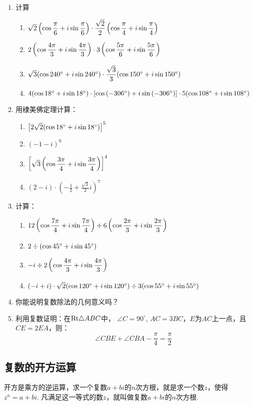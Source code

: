 \begin{ex}
\begin{enumerate}
    \item 计算
\begin{enumerate}[(1)]
    \item $\sqrt{2}\left(\cos{\dfrac{\pi}{6}}+i\sin{\dfrac{\pi}{6}}\right)\cdot \dfrac{\sqrt{2}}{2}\left(\cos{\dfrac{\pi}{4}}+i\sin{\dfrac{\pi}{4}}\right)$
    \item $2\left(\cos{\dfrac{4\pi}{3}}+i\sin{\dfrac{4\pi}{3}}\right)\cdot 3\left(\cos{\dfrac{5\pi}{6}}+i\sin{\dfrac{5\pi}{6}}\right)$
    \item $\sqrt{3}(\cos{240^{\circ}}+i\sin{240^{\circ}})\cdot \dfrac{\sqrt{3}}{3}(\cos{150^{\circ}}+i\sin{150^{\circ}})$
    \item $4(\cos{18^{\circ}}+i\sin{18^{\circ}})\cdot [\cos\left(-306^{\circ}\right)+i\sin\left(-306^{\circ}\right)]\cdot 5(\cos{108^{\circ}}+i\sin{108^{\circ}})$
\end{enumerate}
\item 用棣美佛定理计算：
\begin{enumerate}[(1)]
    \item $\left[2\sqrt{2}(\cos{18^{\circ}}+i\sin{18^{\circ}})\right]^5$
    \item $(-1-i)^6$
    \item $\left[\sqrt{3}\left(\cos{\dfrac{3\pi}{4}}+i\sin{\dfrac{3\pi}{4}}\right)\right]^4$
    \item $(2-i)\cdot \left(-\frac{1}{2}+\frac{\sqrt{3}}{2}i\right)^7$
\end{enumerate}
\item 计算：
\begin{enumerate}[(1)]
    \item $12\left(\cos{\dfrac{7\pi}{4}}+i\sin{\dfrac{7\pi}{4}}\right)\div 6\left(\cos{\dfrac{2\pi}{3}}+i\sin{\dfrac{2\pi}{3}}\right)$
    \item $2\div (\cos{45^{\circ}}+i\sin{45^{\circ}})$
    \item $-i\div 2\left(\cos{\dfrac{4\pi}{3}}+i\sin{\dfrac{4\pi}{3}}\right)$
    \item $(-i+i)\cdot \sqrt{2}(\cos{120^{\circ}}+i\sin{120^{\circ}})\div 3(\cos{55^{\circ}}+i\sin{55^{\circ}})$
\end{enumerate}

\item 你能说明复数除法的几何意义吗？
\item 利用复数证明：在${\rm Rt}\triangle ABC$中，
$\angle C=90^{\circ}$, $AC=3BC$，$E$为$AC$上一点，且$CE=2EA$，则：
\[\angle CBE+\angle CBA-\frac{\pi}{4}=\frac{\pi}{2}\]
\end{enumerate}
\end{ex}

\subsection{复数的开方运算}
开方是乘方的逆运算，求一个复数$a+bi$的$n$次方根，就是求一个数$z$，使得$z^n=a+bi$. 凡满足这一等式的数$z$，就叫做复数$a+bi$的$n$次方根.

